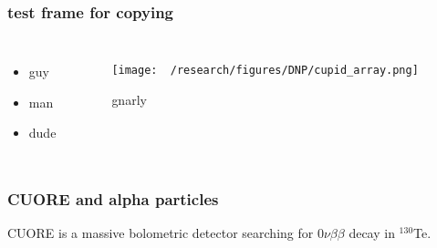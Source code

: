 \documentclass{beamer}
\begin{document}


	\begin{frame}
		\frametitle{test frame for copying}
		\begin{columns}[c] %
			
			\begin{itemize}
				\item guy
				\item man
				\item dude
			\end{itemize}
			
			\begin{figure}
			\texttt{[image: ~/research/figures/DNP/cupid\_array.png]}
			\caption{gnarly}
			\end{figure}
			
		\end{columns}
	\end{frame}


	\begin{frame}
		\frametitle{CUORE and alpha particles}
			
		CUORE is a massive bolometric detector searching for $0\nu\beta\beta$ decay in $^{130}$Te.
	
	\end{frame}
	
	
	
\end{document}
